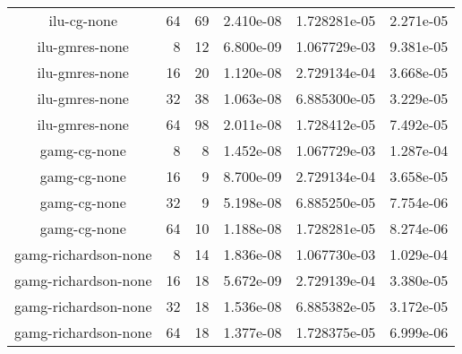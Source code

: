 \documentclass{article}\usepackage[T1]{fontenc}
\begin{document}
\begin{tabular}{crrlll}
ilu-cg-none&64&69&2.410e-08&1.728281e-05&2.271e-05\\
ilu-gmres-none&8&12&6.800e-09&1.067729e-03&9.381e-05\\
ilu-gmres-none&16&20&1.120e-08&2.729134e-04&3.668e-05\\
ilu-gmres-none&32&38&1.063e-08&6.885300e-05&3.229e-05\\
ilu-gmres-none&64&98&2.011e-08&1.728412e-05&7.492e-05\\
gamg-cg-none&8&8&1.452e-08&1.067729e-03&1.287e-04\\
gamg-cg-none&16&9&8.700e-09&2.729134e-04&3.658e-05\\
gamg-cg-none&32&9&5.198e-08&6.885250e-05&7.754e-06\\
gamg-cg-none&64&10&1.188e-08&1.728281e-05&8.274e-06\\
gamg-richardson-none&8&14&1.836e-08&1.067730e-03&1.029e-04\\
gamg-richardson-none&16&18&5.672e-09&2.729139e-04&3.380e-05\\
gamg-richardson-none&32&18&1.536e-08&6.885382e-05&3.172e-05\\
gamg-richardson-none&64&18&1.377e-08&1.728375e-05&6.999e-06\\
\hline\end{tabular}
\end{document}
